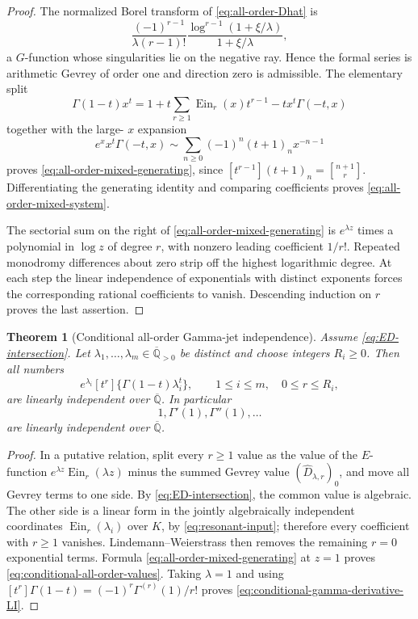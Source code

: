 \documentclass[11pt]{article}
\theoremstyle{keio}
\newtheorem{theorem}{Theorem}[section]
\theoremstyle{definition}
\theoremstyle{remark}
\newcommand{\Qbar}{\overline{\mathbb Q}}
\newcommand{\Ein}{\operatorname{Ein}}
\newcommand{\stirling}[2]{\genfrac{[}{]}{0pt}{}{#1}{#2}}
\begin{document}
\begin{proof}
The normalized Borel transform of \eqref{eq:all-order-Dhat} is
\[
 \frac{(-1)^{r-1}}{\lambda(r-1)!}
 \frac{\log^{r-1}(1+\xi/\lambda)}{1+\xi/\lambda},
\]
a \(G\)-function whose singularities lie on the negative ray.  Hence the
formal series is arithmetic Gevrey of order one and direction zero is
admissible.  The elementary split
\[
 \Gamma(1-t)x^t
 =1+t\sum_{r\ge1}\Ein_r(x)t^{r-1}
   -t x^t\Gamma(-t,x)
\]
together with the large-
\(x\) expansion
\[
 e^x x^t\Gamma(-t,x)
 \sim\sum_{n\ge0}(-1)^n(t+1)_n x^{-n-1}
\]
proves \eqref{eq:all-order-mixed-generating}, since
\([t^{r-1}](t+1)_n=\stirling{n+1}{r}\).  Differentiating the generating
identity and comparing coefficients proves
\eqref{eq:all-order-mixed-system}.

The sectorial sum on the right of
\eqref{eq:all-order-mixed-generating} is \(e^{\lambda z}\) times a
polynomial in \(\log z\) of degree \(r\), with nonzero leading coefficient
\(1/r!\).  Repeated monodromy differences about zero strip off the highest
logarithmic degree.  At each step the linear independence of exponentials
with distinct exponents forces the corresponding rational coefficients to
vanish.  Descending induction on \(r\) proves the last assertion.
\end{proof}

\begin{theorem}[Conditional all-order Gamma-jet independence]
\label{thm:conditional-all-order-gamma}
Assume \eqref{eq:ED-intersection}.  Let
\(\lambda_1,\ldots,\lambda_m\in\Qbar_{>0}\) be distinct and choose
integers \(R_i\ge0\).  Then all numbers
\begin{equation}\label{eq:conditional-all-order-values}
 \boxed{\displaystyle
 e^{\lambda_i}[t^r]\{\Gamma(1-t)\lambda_i^t\},
 \qquad 1\le i\le m,\quad0\le r\le R_i,}
\end{equation}
are linearly independent over \(\Qbar\).  In particular
\begin{equation}\label{eq:conditional-gamma-derivative-LI}
 \boxed{1,\Gamma'(1),\Gamma''(1),\ldots}
\end{equation}
are linearly independent over \(\Qbar\).
\end{theorem}

\begin{proof}
In a putative relation, split every \(r\ge1\) value as the value of the
\(E\)-function \(e^{\lambda z}\Ein_r(\lambda z)\) minus the summed
Gevrey value \((\widehat D_{\lambda,r})_0\), and move all Gevrey terms to
one side.  By \eqref{eq:ED-intersection}, the common value is algebraic.
The other side is a linear form in the jointly algebraically independent
coordinates \(\Ein_r(\lambda_i)\) over \(K\), by
\eqref{eq:resonant-input}; therefore every coefficient with \(r\ge1\)
vanishes.  Lindemann--Weierstrass then removes the remaining \(r=0\)
exponential terms.  Formula \eqref{eq:all-order-mixed-generating} at
\(z=1\) proves \eqref{eq:conditional-all-order-values}.  Taking
\(\lambda=1\) and using
\([t^r]\Gamma(1-t)=(-1)^r\Gamma^{(r)}(1)/r!\) proves
\eqref{eq:conditional-gamma-derivative-LI}.
\end{proof}
\end{document}
